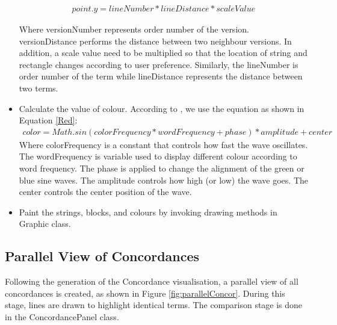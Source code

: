 \begin{itemize}
	\begin{multline}\label{PointY}
	point.y= lineNumber*lineDistance*scaleValue
	\end{multline}
	
	Where versionNumber represents order number of the version. versionDistance performs the  distance between two neighbour versions. In addition, a scale value need to be multiplied so that the location of string and rectangle changes according to user preference.
	Similarly, the lineNumber is order number of the term while lineDistance represents the distance between two terms. 
	
	\item \textbf{}Calculate the value of colour. According to \cite{Jbum}, we use the equation as shown in Equation \eqref{Red}: 	
	\begin{multline}\label{Red}
	color = Math.sin(colorFrequency*wordFrequency + phase) * amplitude + center
	\end{multline}
	Where colorFrequency is a constant that controls how fast the wave oscillates. The wordFrequency is  variable used to display different colour according to word frequency. The phase is applied to change the alignment of the green or blue sine waves. The amplitude controls how high (or low) the wave goes. The center controls the center position of the wave.
	
	\item \textbf{}Paint the strings, blocks, and colours by invoking drawing methods in Graphic class. 
	
\end{itemize}

\subsection{Parallel View of Concordances}

Following the generation of the Concordance visualisation, a parallel view of all concordances is created, as shown in Figure \ref{fig:parallelConcor}. During this stage, lines are drawn to highlight identical terms. The comparison stage is done in the ConcordancePanel class. 

